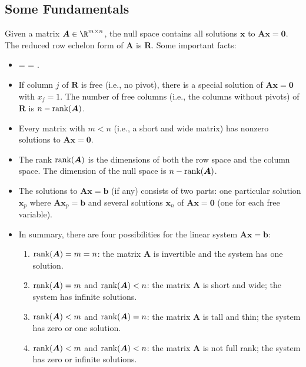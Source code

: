 
\subsection{Some Fundamentals}
    Given a matrix $\bm{A} \in \R^{m \times n}$, the null space contains all solutions $\bm{x}$ to $\bm{A}\bm{x} = \bm{0}$.
    The reduced row echelon form of $\bm{A}$ is $\bm{R}$.
    Some important facts:
    \begin{itemize}
        \item {} =  = .
        \item If column $j$ of $\bm{R}$ is free (i.e., no pivot), there is a special solution of $\bm{A}\bm{x}=\bm{0}$ with $x_j=1$.
        The number of free columns (i.e., the columns without pivots) of $\bm{R}$ is $n -  \text{rank} (\bm{A})$.
        \item Every matrix with $m < n$ (i.e., a short and wide matrix) has nonzero solutions to $\bm{A}\bm{x} = \bm{0}$.
        \item The rank $ \text{rank} (\bm{A})$ is the dimensions of both the row space and the column space. The dimension of the null space is $n -  \text{rank} (\bm{A})$.
        \item The solutions to $\bm{A}\bm{x} = \bm{b}$ (if any) consists of two parts: one particular solution $\bm{x}_p$ where $\bm{A}\bm{x}_p = \bm{b}$ and several solutions $\bm{x}_n$ of $\bm{A} \bm{x} = \bm{0}$ (one for each free variable).
        \item In summary, there are four possibilities for the linear system $\bm{A} \bm{x} = \bm{b}$:
            \begin{enumerate}
                \item $ \text{rank} (\bm{A}) = m = n$: the matrix $\bm{A}$ is invertible and the system has one solution.
                \item $ \text{rank} (\bm{A}) = m$ and $ \text{rank} (\bm{A}) < n$: the matrix $\bm{A}$ is short and wide; the system has infinite solutions.
                \item $ \text{rank} (\bm{A}) < m$ and $ \text{rank} (\bm{A}) = n$: the matrix $\bm{A}$ is tall and thin; the system has zero or one solution.
                \item $ \text{rank} (\bm{A}) < m$ and $ \text{rank} (\bm{A}) < n$: the matrix $\bm{A}$ is not full rank; the system has zero or infinite solutions.
            \end{enumerate}
        \end{itemize}




